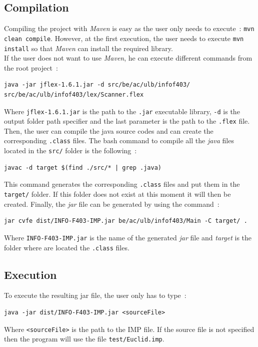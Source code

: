 \documentclass[a4paper,11pt]{article}
\begin{document}
  \subsection{Compilation}
    Compiling the project with \textit{Maven} is easy as the user only needs to execute~: \verb|mvn clean compile|. However, at the first execution, the user needs to execute \verb|mvn install| so that \textit{Maven} can install the required library.\\ %
    If the user does not want to use \textit{Maven}, he can execute different commands from the root project~:
    \begin{verbatim}
java -jar jflex-1.6.1.jar -d src/be/ac/ulb/infof403/ src/be/ac/ulb/infof403/lex/Scanner.flex
    \end{verbatim}
    Where \verb|jflex-1.6.1.jar| is the path to the \verb|.jar| executable library,  \verb|-d| is the output folder path specifier and the last parameter is the path to the \verb|.flex| file.\\
    Then, the user can compile the java source codes and can create the corresponding \verb|.class| files. The bash command to compile all the \textit{java} files located in the \verb|src/| folder is the following~: %
    \begin{verbatim}
javac -d target $(find ./src/* | grep .java)
    \end{verbatim}
    This command generates the corresponding \verb|.class| files and put them in the \verb|target/| folder. If this folder does not exist at this moment it will then be created. Finally, the \textit{jar} file can be generated by using the command~:
    \begin{verbatim}
jar cvfe dist/INFO-F403-IMP.jar be/ac/ulb/infof403/Main -C target/ .
    \end{verbatim}
    Where \verb|INFO-F403-IMP.jar| is the name of the generated \textit{jar} file and \textit{target} is the folder where are located the \verb|.class| files.
    
  \subsection{Execution}
    To execute the resulting jar file, the user only has to type~:
    \begin{verbatim}
java -jar dist/INFO-F403-IMP.jar <sourceFile>
    \end{verbatim}
    Where \verb|<sourceFile>| is the path to the IMP file. If the source file is not specified then the program will use the file \verb|test/Euclid.imp|.
    
\end{document}
